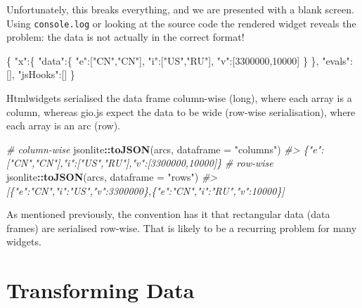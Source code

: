 \documentclass[10pt,]{krantz}
\makeatletter
\newenvironment{Shaded}{\begin{snugshade}}{\end{snugshade}}
\newcommand{\CommentTok}[1]{\textcolor[rgb]{0.37,0.37,0.37}{\textit{#1}}}
\newcommand{\DataTypeTok}[1]{\textcolor[rgb]{0.27,0.27,0.27}{#1}}
\newcommand{\DecValTok}[1]{\textcolor[rgb]{0.06,0.06,0.06}{#1}}
\newcommand{\FunctionTok}[1]{\textcolor[rgb]{0,0,0}{#1}}
\newcommand{\KeywordTok}[1]{\textcolor[rgb]{0.27,0.27,0.27}{\textbf{#1}}}
\newcommand{\NormalTok}[1]{#1}
\newcommand{\OperatorTok}[1]{\textcolor[rgb]{0.43,0.43,0.43}{\textbf{#1}}}
\newcommand{\OtherTok}[1]{\textcolor[rgb]{0.37,0.37,0.37}{#1}}
\newcommand{\StringTok}[1]{\textcolor[rgb]{0.5,0.5,0.5}{#1}}
\newenvironment{kframe}{%
\medskip{}
\setlength{\fboxsep}{.8em}
 \def\at@end@of@kframe{}%
 \ifinner\ifhmode%
  \def\at@end@of@kframe{\end{minipage}}%
  \begin{minipage}{\columnwidth}%
 \fi\fi%
 \def\FrameCommand##1{\hskip\@totalleftmargin \hskip-\fboxsep
 \colorbox{shadecolor}{##1}\hskip-\fboxsep
     \hskip-\linewidth \hskip-\@totalleftmargin \hskip\columnwidth}%
 \MakeFramed {\advance\hsize-\width
   \@totalleftmargin\z@ \linewidth\hsize
   \@setminipage}}%
 {\par\unskip\endMakeFramed%
 \at@end@of@kframe}
\renewenvironment{Shaded}{\begin{kframe}}{\end{kframe}}
\makeatother
\begin{document}
Unfortunately, this breaks everything, and we are presented with a blank screen. Using \texttt{console.log} or looking at the source code the rendered widget reveals the problem: the data is not actually in the correct format!

\begin{Shaded}
\begin{Highlighting}[]
\FunctionTok{\{}
  \DataTypeTok{"x"}\FunctionTok{:\{}
    \DataTypeTok{"data"}\FunctionTok{:\{}
      \DataTypeTok{"e"}\FunctionTok{:}\OtherTok{[}\StringTok{"CN"}\OtherTok{,}\StringTok{"CN"}\OtherTok{]}\FunctionTok{,}
      \DataTypeTok{"i"}\FunctionTok{:}\OtherTok{[}\StringTok{"US"}\OtherTok{,}\StringTok{"RU"}\OtherTok{]}\FunctionTok{,}
      \DataTypeTok{"v"}\FunctionTok{:}\OtherTok{[}\DecValTok{3300000}\OtherTok{,}\DecValTok{10000}\OtherTok{]}
    \FunctionTok{\}}
  \FunctionTok{\},}
  \DataTypeTok{"evals"}\FunctionTok{:}\OtherTok{[]}\FunctionTok{,}
  \DataTypeTok{"jsHooks"}\FunctionTok{:}\OtherTok{[]}
\FunctionTok{\}}
\end{Highlighting}
\end{Shaded}

Htmlwidgets serialised the data frame column-wise (long), where each array is a column, whereas gio.js expect the data to be wide (row-wise serialisation), where each array is an arc (row).

\begin{Shaded}
\begin{Highlighting}[]
\CommentTok{# column-wise}
\NormalTok{jsonlite}\OperatorTok{::}\KeywordTok{toJSON}\NormalTok{(arcs, }\DataTypeTok{dataframe =} \StringTok{"columns"}\NormalTok{)}
\CommentTok{#> \{"e":["CN","CN"],"i":["US","RU"],"v":[3300000,10000]\}}
\CommentTok{# row-wise}
\NormalTok{jsonlite}\OperatorTok{::}\KeywordTok{toJSON}\NormalTok{(arcs, }\DataTypeTok{dataframe =} \StringTok{"rows"}\NormalTok{)}
\CommentTok{#> [\{"e":"CN","i":"US","v":3300000\},\{"e":"CN","i":"RU","v":10000\}]}
\end{Highlighting}
\end{Shaded}

As mentioned previously, the convention has it that rectangular data (data frames) are serialised row-wise. That is likely to be a recurring problem for many widgets.

\hypertarget{widgets-full-transform-data}{%
\section{Transforming Data}\label{widgets-full-transform-data}}
\end{document}
